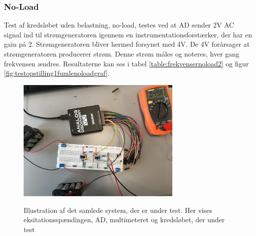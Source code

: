 \subsubsection{No-Load}
Test af kredsløbet uden belastning, no-load, testes ved at AD sender 2V AC signal ind til strømgeneratoren igennem en instrumentationsforstærker, der har en gain på 2. Strømgeneratoren bliver hermed forsynet med 4V. De 4V forårsager at strømgeneratoren producerer strøm. Denne strøm  måles og noteres, hver gang frekvensen ændres. Resultaterne kan ses i tabel \ref{table:frekvensernoload2} og figur \ref{fig:testopstilling1fumlenoloadgraf}.


  


\begin{figure}[H]
\centering
{\includegraphics[width=8cm]
{Figure/oprindeligekredslobfumle1}}
\caption{Illustration af det samlede system, der er under test. Her vises eksitationsspændingen, AD, multimeteret og kredsløbet, der under test}
\label{fig:oprindeligekredslobfumle1}
\end{figure}





